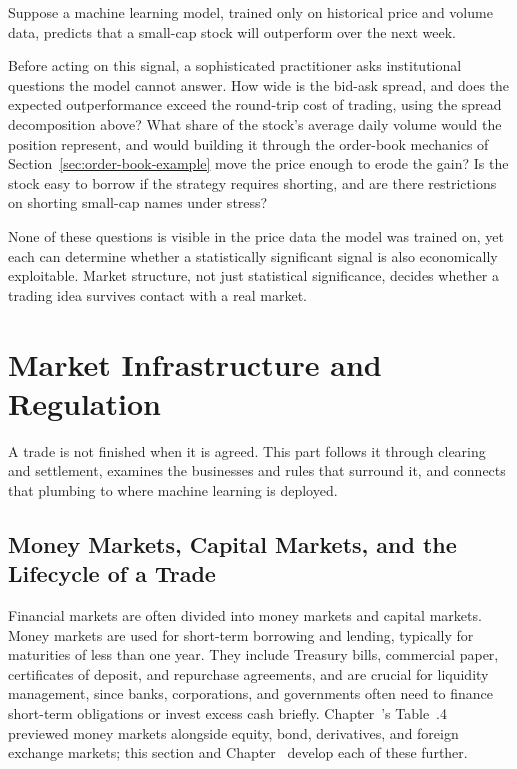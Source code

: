 \documentclass[../ai_in_finance]{subfiles}
\begin{document}
Suppose a machine learning model, trained only on historical price and volume data, predicts that a small-cap stock will outperform over the next week.

Before acting on this signal, a sophisticated practitioner asks institutional questions the model cannot answer. How wide is the bid-ask spread, and does the expected outperformance exceed the round-trip cost of trading, using the spread decomposition above? What share of the stock's average daily volume would the position represent, and would building it through the order-book mechanics of Section~\ref{sec:order-book-example} move the price enough to erode the gain? Is the stock easy to borrow if the strategy requires shorting, and are there restrictions on shorting small-cap names under stress?

None of these questions is visible in the price data the model was trained on, yet each can determine whether a statistically significant signal is also economically exploitable. Market structure, not just statistical significance, decides whether a trading idea survives contact with a real market.

\section{Market Infrastructure and Regulation}

A trade is not finished when it is agreed. This part follows it through clearing and settlement, examines the businesses and rules that surround it, and connects that plumbing to where machine learning is deployed.

\subsection{Money Markets, Capital Markets, and the Lifecycle of a Trade}

Financial markets are often divided into money markets and capital markets. Money markets are used for short-term borrowing and lending, typically for maturities of less than one year. They include Treasury bills, commercial paper, certificates of deposit, and repurchase agreements, and are crucial for liquidity management, since banks, corporations, and governments often need to finance short-term obligations or invest excess cash briefly. Chapter~'s Table~.4 previewed money markets alongside equity, bond, derivatives, and foreign exchange markets; this section and Chapter~ develop each of these further.
\end{document}
